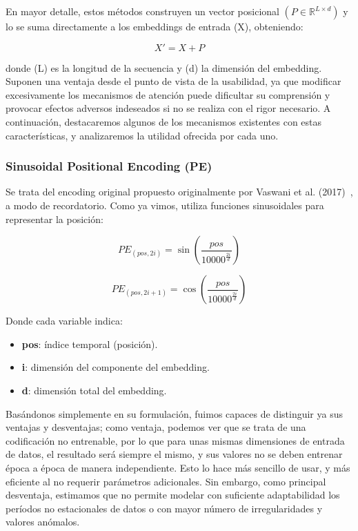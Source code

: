 En mayor detalle, estos métodos construyen un vector posicional $(P \in \mathbb{R}^{L \times d})$ y lo se suma directamente a los embeddings de entrada (X), obteniendo:

$$ X' = X + P $$

donde (L) es la longitud de la secuencia y (d) la dimensión del embedding.\\

Suponen una ventaja desde el punto de vista de la usabilidad, ya que modificar excesivamente los mecanismos de atención puede dificultar su comprensión y provocar efectos adversos indeseados si no se realiza con el rigor necesario. A continuación, destacaremos algunos de los mecanismos existentes con estas características, y analizaremos la utilidad ofrecida por cada uno.

\subsubsection{Sinusoidal Positional Encoding (PE)}

Se trata del encoding original propuesto originalmente por Vaswani et al. (2017)~\cite{vaswani2023attentionneed}, a modo de recordatorio. Como ya vimos, utiliza funciones sinusoidales para representar la posición:

$$
PE_{(pos, 2i)} = \sin\left(\frac{pos}{10000^{\frac{2i}{d}}}\right)
$$

$$
PE_{(pos, 2i+1)} = \cos\left(\frac{pos}{10000^{\frac{2i}{d}}}\right)
$$

Donde cada variable indica:

\begin{itemize}
	\item \textbf{pos}: índice temporal (posición).
	\item \textbf{i}: dimensión del componente del embedding.
	\item \textbf{d}: dimensión total del embedding.
\end{itemize}

Basándonos simplemente en su formulación, fuimos capaces de distinguir ya sus ventajas y desventajas; como ventaja, podemos ver que se trata de una codificación no entrenable, por lo que para unas mismas dimensiones de entrada de datos, el resultado será siempre el mismo, y sus valores no se deben entrenar época a época de manera independiente. Esto lo hace más sencillo de usar, y más eficiente al no requerir parámetros adicionales. Sin embargo, como principal desventaja, estimamos que no permite modelar con suficiente adaptabilidad los períodos no estacionales de datos o con mayor número de irregularidades y valores anómalos.\\

